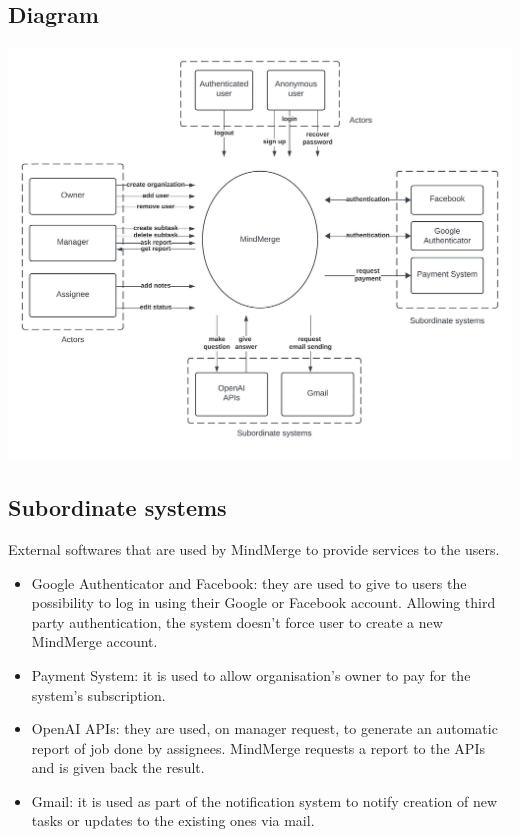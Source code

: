 \documentclass{article}
\begin{document}
\subsection{Diagram}
\includegraphics[width=\textwidth, height=\textheight, keepaspectratio]{images/context_diagram.jpeg}

\subsection{Subordinate systems}
External softwares that are used by MindMerge to provide services to the users.
\begin{itemize}
    \item Google Authenticator and Facebook: they are used to give to users the possibility to log in using their Google or Facebook account. Allowing third party authentication, the system doesn't force user to create a new MindMerge account.
    \item Payment System: it is used to allow organisation's owner to pay for the system's subscription.
    \item OpenAI APIs: they are used, on manager request, to generate an automatic report of job done by assignees. MindMerge requests a report to the APIs and is given back the result.
    \item Gmail: it is used as part of the notification system to notify creation of new tasks or updates to the existing ones via mail.
\end{itemize}
\end{document}
